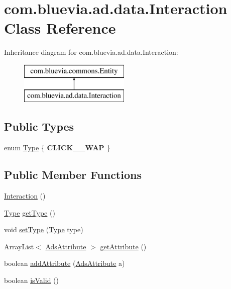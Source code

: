 \hypertarget{classcom_1_1bluevia_1_1ad_1_1data_1_1Interaction}{
\section{com.bluevia.ad.data.Interaction Class Reference}
\label{classcom_1_1bluevia_1_1ad_1_1data_1_1Interaction}
}
Inheritance diagram for com.bluevia.ad.data.Interaction:\begin{figure}[H]
\begin{center}
\leavevmode
\includegraphics[height=2.000000cm]{classcom_1_1bluevia_1_1ad_1_1data_1_1Interaction}
\end{center}
\end{figure}
\subsection*{Public Types}
\begin{DoxyCompactItemize}
\item 
enum \hyperlink{classcom_1_1bluevia_1_1ad_1_1data_1_1Interaction_ae54ba32a2f1d9d40a450ace53828a2ee}{Type} \{ {\bfseries CLICK\_\_\-WAP}
 \}
\end{DoxyCompactItemize}
\subsection*{Public Member Functions}
\begin{DoxyCompactItemize}
\item 
\hyperlink{classcom_1_1bluevia_1_1ad_1_1data_1_1Interaction_a9e872e831a8bdf928abad16da7010cf2}{Interaction} ()
\item 
\hyperlink{classcom_1_1bluevia_1_1ad_1_1data_1_1Interaction_ae54ba32a2f1d9d40a450ace53828a2ee}{Type} \hyperlink{classcom_1_1bluevia_1_1ad_1_1data_1_1Interaction_a3f4d28571d05c534fc52c3ad02e4cc7a}{getType} ()
\item 
void \hyperlink{classcom_1_1bluevia_1_1ad_1_1data_1_1Interaction_a05217fbc8d8a8138a361a23982d17866}{setType} (\hyperlink{classcom_1_1bluevia_1_1ad_1_1data_1_1Interaction_ae54ba32a2f1d9d40a450ace53828a2ee}{Type} type)
\item 
ArrayList$<$ \hyperlink{classcom_1_1bluevia_1_1ad_1_1data_1_1AdsAttribute}{AdsAttribute} $>$ \hyperlink{classcom_1_1bluevia_1_1ad_1_1data_1_1Interaction_ab4336e71f7d27bc6ea8636409020bc5f}{getAttribute} ()
\item 
boolean \hyperlink{classcom_1_1bluevia_1_1ad_1_1data_1_1Interaction_ac221713cde644ca796da93112b2bd508}{addAttribute} (\hyperlink{classcom_1_1bluevia_1_1ad_1_1data_1_1AdsAttribute}{AdsAttribute} a)
\item 
boolean \hyperlink{classcom_1_1bluevia_1_1ad_1_1data_1_1Interaction_ad1037318f64a0cd8f5d45dbf587d3bea}{isValid} ()
\end{DoxyCompactItemize}


